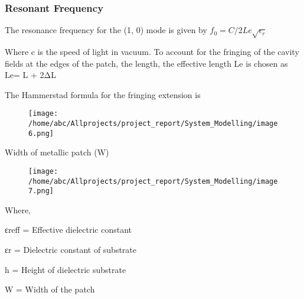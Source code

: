 \documentclass[12pt]{article}
\begin{document}
              \subsubsection{Resonant Frequency}\label{sub:Resonant Frequency}
               \justify
	              The resonance frequency for the (1, 0) mode is given by
			          \newline    \newline
			          \centering
			              $ f_0 = C/2Le\sqrt{\epsilon_r } $
	                               
	               Where c is the speed of light in vacuum. To account for the fringing of the cavity fields at the edges of the patch, the length, the effective length Le is chosen as
	               \newline
						               \centering
	                                        Le= L + 2ΔL                                                  
	               
	               The Hammerstad formula for the fringing extension is	
	                
	                 \begin{figure}[H]
	                 	\centering
	                 	\texttt{[image: /home/abc/Allprojects/project\_report/System\_Modelling/image6.png]}

	                 \end{figure}
		                                               
	                      Width of metallic patch (W)
				        \begin{figure}[H]
				        	\centering
				        	\texttt{[image: /home/abc/Allprojects/project\_report/System\_Modelling/image7.png]}
				        	
				        \end{figure}
	                      
	                      Where,
	                      \item
	                        εreff = Effective dielectric constant
                          \item
	                        εr = Dielectric constant of substrate
	                      \item
	                        h = Height of dielectric substrate
                           \item
	                        W = Width of the patch
	              
\end{document}
